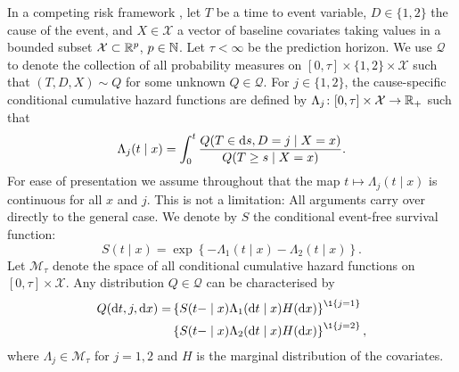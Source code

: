 In a competing risk framework \citep{andersen2012statistical}, let
\( T\) be a time to event variable, \(D\in\{1,2\}\) the cause of the
event, and $X \in \mathcal{X}$ a vector of baseline covariates taking
values in a bounded subset \( \mathcal{X} \subset \mathbb{R}^p \),
\( p\in\mathbb{N} \). Let $\tau< \infty$ be the prediction horizon. We use
\( \mathcal{Q} \) to denote the collection of all probability measures
on \( [0,\tau] \times \{1,2\}\times \mathcal{X} \) such that
\( (T, D, X) \sim Q \) for some unknown \( Q \in \mathcal{Q} \). For
\(j\in\{1,2\}\), the cause-specific conditional cumulative hazard
functions are defined by
\( \Lambda_{j} \colon [0, \tau] \times \mathcal{X} \rightarrow \mathbb{R}_+ \)
such that
\begin{equation*}
  \Lambda_{j}(t \mid x) = \int_0^t\frac{  Q(T \in \mathop{}\!\mathrm{d} s, D=j \mid X=x )}{Q(T \geq s \mid X=x )}.
\end{equation*}
For ease of presentation we assume throughout that the map
\( t\mapsto \Lambda_j(t \mid x) \) is continuous for all \( x \) and
\( j \). This is not a limitation: All arguments carry over directly
to the general case. We denote by \(S\) the conditional event-free
survival function:
\begin{equation}
  \label{eq:surv-def}
  S(t \mid x)=\exp\left\{-\Lambda_{1}(t \mid x)-\Lambda_{2}(t \mid x)\right\}.
\end{equation}
Let \( \mathcal{M}_{\tau}\) denote the space of all conditional cumulative hazard
functions on \( [0,\tau] \times\mathcal{X}\). Any distribution
\( Q \in \mathcal{Q} \) can be characterised by
\begin{equation*}
  \label{eq:parametrizeQ}
  \begin{split}
    Q(\diff t,j,\diff x)=& \left\{S(t- \mid x)\Lambda_1(\diff t \mid x)H(\diff x)\right\}^{\1{\{j=1\}}}\\
                         &  \left\{S(t- \mid x)\Lambda_2(\diff t \mid x)H(\diff x)\right\}^{\1{\{j=2\}}},
  \end{split}
\end{equation*}
where \(\Lambda_{j} \in \mathcal{M}_{\tau}\) for \(j=1,2\) and \(H\) is the marginal
distribution of the covariates.


